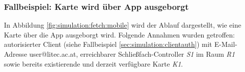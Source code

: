 \subsubsection{Fallbeispiel: Karte wird über App ausgeborgt}
In Abbildung \ref{fig:simulation:fetch:mobile} wird der Ablauf dargestellt, wie eine Karte über die App ausgeborgt wird. Folgende Annahmen wurden getroffen: autorisierter Client (siehe Fallbeispiel \ref{sec:simulation:clientauth}) mit E-Mail-Adresse \frqq{}user@litec.ac.at\flqq{}, erreichbarer Schließfach-Controller \textit{S1} im Raum \textit{R1} sowie bereits existierende und derzeit verfügbare Karte \textit{K1}. 
\vspace*{\fill}
\begin{center}
    \label{fig:simulation:fetch:mobile}
\end{center}
\vspace*{\fill}

\newpage
